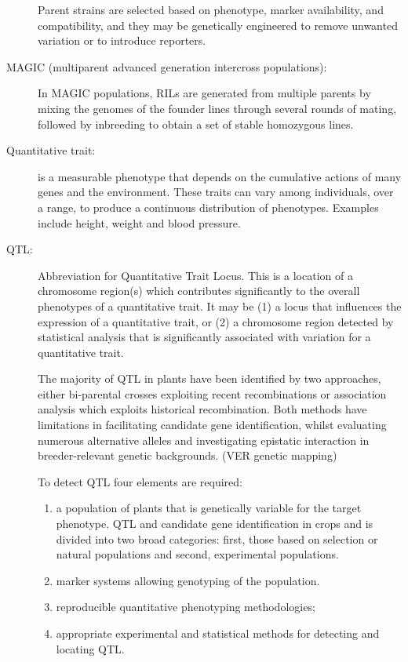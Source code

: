 \documentclass[a4paper,10pt]{article}
\begin{document}
\begin{description}
Parent strains are selected based on phenotype, marker availability, and compatibility, and they may be genetically engineered to remove unwanted variation or to introduce reporters.

\item [MAGIC (multiparent advanced generation intercross populations):] 
In MAGIC populations, RILs are generated from multiple parents by mixing the genomes of the founder lines through several rounds of mating, followed by inbreeding to obtain a set of stable homozygous lines.

\item[Quantitative trait:]  is a measurable phenotype that depends on the cumulative actions of many genes and the environment. 
These traits can vary among individuals, over a range, to produce a continuous distribution of phenotypes. 
Examples include height, weight and blood pressure.
\item[QTL:] Abbreviation for Quantitative Trait Locus. This is a location of a chromosome region(s) which contributes significantly to the overall phenotypes of a quantitative trait. 
It may be (1) a locus that influences the expression of a quantitative trait, or (2) a chromosome region detected by statistical analysis that is significantly associated with variation for a quantitative trait.

The majority of QTL in plants have been identified by two approaches, either bi-parental crosses exploiting recent recombinations or association analysis which exploits historical recombination.
Both methods have limitations in facilitating candidate gene identification, whilst evaluating numerous alternative alleles and investigating epistatic interaction in breeder-relevant genetic backgrounds. (VER genetic mapping)

To detect QTL four elements are required: 
\begin{enumerate}
 \item a population of plants that is genetically variable for the target phenotype. 
 QTL and candidate gene identification in crops and is divided into two broad categories: first, those based on selection or natural populations and second, experimental populations.
 \item marker systems allowing genotyping of the population.
 \item reproducible quantitative phenotyping methodologies;
 \item appropriate experimental and statistical methods for detecting and locating QTL.
\end{enumerate}


\end{description}
\end{document}
